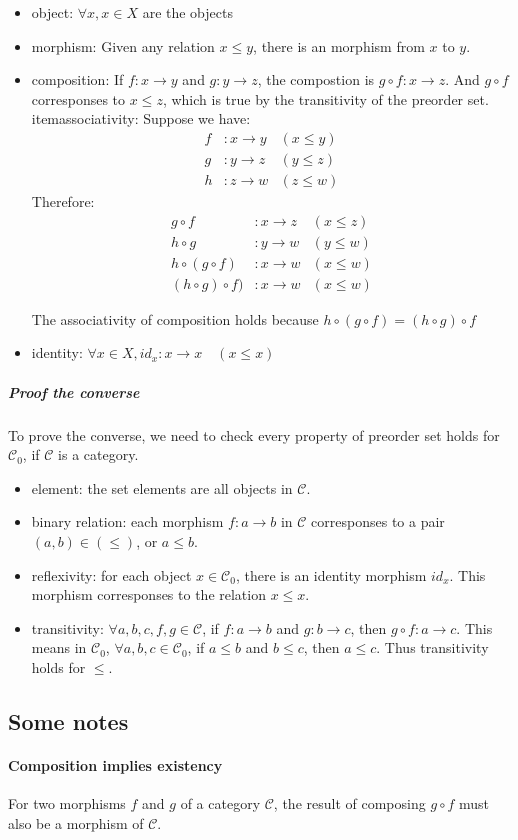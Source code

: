 \documentclass[11pt]{article}
\begin{document}
\begin{itemize}
\item{object}: $\forall x, x \in X$ are the objects
\item{morphism}: Given any relation $x \le y$,
there is an morphism from $x$ to $y$.
\item{composition}: If $f: x \rightarrow y$ and $g: y \rightarrow z$,
the compostion is $g \circ f: x \rightarrow z$. And $g \circ f$ corresponses to
$x \le z$, which is true by the transitivity of the preorder set.
item{associativity}: Suppose we have:
\begin{align*}
f &: x \rightarrow y & (x \le y) \\
g &: y \rightarrow z & (y \le z) \\
h &: z \rightarrow w & (z \le w)
\end{align*}
Therefore:
\begin{align*}
g \circ f &: x \rightarrow z & (x \le z) \\
h \circ g &: y \rightarrow w & (y \le w) \\
h \circ (g \circ f) &: x \rightarrow w & (x \le w) \\
(h \circ g) \circ f) &: x \rightarrow w & (x \le w)
\end{align*}

The associativity of composition holds because
$h \circ (g \circ f) = (h \circ g) \circ f$
\item{identity}: $\forall x \in X, id_x: x \rightarrow x \quad (x \le x)$
\end{itemize}

\subparagraph{Proof the converse}

To prove the converse, we need to check every property of preorder set holds for
$\mathcal{C}_0$, if $\mathcal{C}$ is a category.

\begin{itemize}
\item{element}: the set elements are all objects in $\mathcal{C}$.
\item{binary relation}: each morphism $f: a \rightarrow b$ in $\mathcal{C}$
corresponses to a pair $(a,b) \in (\le)$, or $a \le b$.
\item{reflexivity}: for each object $x \in \mathcal{C}_0$, there is an identity morphism
$id_x$. This morphism corresponses to the relation $x \le x$.
\item{transitivity}: $\forall a,b,c,f,g \in \mathcal{C}$, if
 $f: a \rightarrow b$ and $g: b \rightarrow c$, then $g \circ f: a \rightarrow c$.
This means in $\mathcal{C}_0$, $\forall a,b,c \in \mathcal{C}_0$,
if $a \le b$ and $b \le c$, then $a \le c$. Thus transitivity holds for $\le$.
\end{itemize}

\subsection{Some notes}

\paragraph{Composition implies existency}
For two morphisms $f$ and $g$ of a category $\mathcal{C}$, the result of composing $g \circ f$
must also be a morphism of $\mathcal{C}$.
\end{document}
